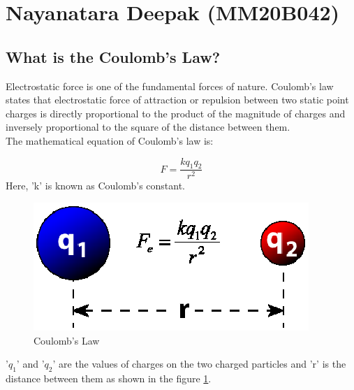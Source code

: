 \section{Nayanatara Deepak (MM20B042)}

\vspace{0.5cm}
\subsection{What is the Coulomb's Law?}
Electrostatic force is one of the fundamental forces of nature. Coulomb's law states that electrostatic force of attraction or repulsion between two static point charges is directly proportional to the product of the magnitude of charges and inversely proportional to the square of the distance between them.
\\The mathematical equation of Coulomb's law is:

\begin{equation}
	F = \frac{kq_1q_2}{r^2}
	\label{eqn:1}
\end{equation}
Here, 'k' is known as Coulomb's constant. 

\begin{figure}[h]
	\begin{center}
		\includegraphics[scale=1.5]{mm20b042/mm20b042.eps}
	\end{center}
	\caption{Coulomb's Law}
	\label{fig1}
\end{figure}

'$q_1$' and '$q_2$' are the values of charges on the two charged particles and 'r' is the distance between them as shown in the figure \ref{fig1}.

